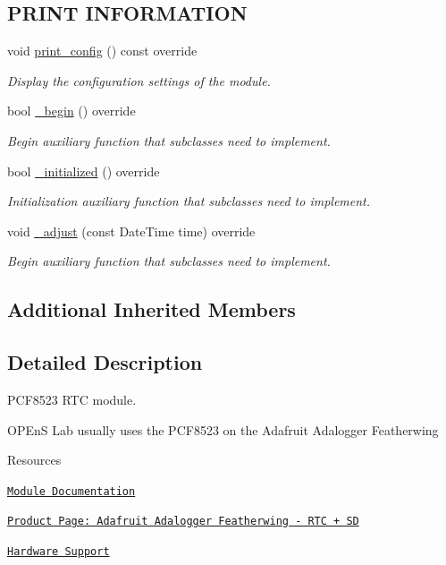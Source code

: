 \subsection*{P\+R\+I\+NT I\+N\+F\+O\+R\+M\+A\+T\+I\+ON}
\begin{DoxyCompactItemize}
\item 
void \hyperlink{class_loom___p_c_f8523_a428ddebfaec1b10cbe079f8aa5f64972}{print\+\_\+config} () const override
\begin{DoxyCompactList}\small\item\em Display the configuration settings of the module. \end{DoxyCompactList}\item 
bool \hyperlink{class_loom___p_c_f8523_a227ca0224556b60f619fa9c3d662c02f}{\+\_\+begin} () override
\begin{DoxyCompactList}\small\item\em Begin auxiliary function that subclasses need to implement. \end{DoxyCompactList}\item 
bool \hyperlink{class_loom___p_c_f8523_a3b675c9d7a74ac2ddfa0f83a61073859}{\+\_\+initialized} () override
\begin{DoxyCompactList}\small\item\em Initialization auxiliary function that subclasses need to implement. \end{DoxyCompactList}\item 
void \hyperlink{class_loom___p_c_f8523_a86528ef00f1971a8eee8f93644d638cb}{\+\_\+adjust} (const Date\+Time time) override
\begin{DoxyCompactList}\small\item\em Begin auxiliary function that subclasses need to implement. \end{DoxyCompactList}\end{DoxyCompactItemize}
\subsection*{Additional Inherited Members}


\subsection{Detailed Description}
P\+C\+F8523 R\+TC module. 

O\+P\+EnS Lab usually uses the P\+C\+F8523 on the Adafruit Adalogger Featherwing

\begin{DoxyParagraph}{Resources}

\begin{DoxyItemize}
\item \href{https://openslab-osu.github.io/Loom/html/class_loom___p_c_f8523.html}{\tt Module Documentation}
\item \href{https://www.adafruit.com/product/2922}{\tt Product Page\+: Adafruit Adalogger Featherwing -\/ R\+TC + SD}
\item \href{https://github.com/OPEnSLab-OSU/Loom/wiki/Hardware-Support#adalogger--pcf8523-rtc}{\tt Hardware Support} 
\end{DoxyItemize}
\end{DoxyParagraph}


